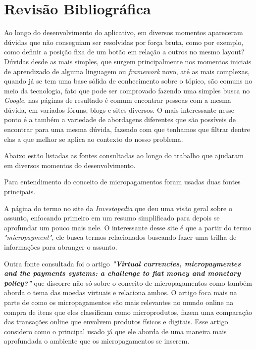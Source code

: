 \documentclass[hidelinks,12pt]{article}
\begin{document}
\section{Revis\~ao Bibliogr\'afica} \label{revisao}
Ao longo do desenvolvimento do aplicativo, em diversos momentos apareceram d\'uvidas que n\~ao conseguiam ser resolvidas por for\c{c}a bruta, como por exemplo, como definir a posi\c{c}\~ao fixa de um bot\~ao em rela\c{c}\~ao a outros no mesmo layout? D\'uvidas desde as mais simples, que surgem principalmente nos momentos iniciais de aprendizado de alguma linguagem ou \textit{framework} novo, at\'e as mais complexas, quando j\'a se tem uma base s\'olida de conhecimento sobre o t\'opico, s\~ao comuns no meio da tecnologia, fato que pode ser comprovado fazendo uma simples busca no \textit{Google}, nas p\'aginas de resultado \'e comum encontrar pessoas com a mesma d\'uvida, em variados f\'oruns, blogs e  sites diversos. O mais interessante nesse ponto \'e a tamb\'em a variedade de abordagens diferentes que s\~ao poss\'iveis de encontrar para uma mesma d\'uvida, fazendo com que tenhamos que filtrar dentre elas a que melhor se aplica ao contexto do nosso problema.

Abaixo est\~ao listadas as fontes consultadas ao longo do trabalho que ajudaram em diversos momentos do desenvolvimento.

Para entendimento do conceito de micropagamentos foram usadas duas fontes principais.

A p\'agina do termo \cite{invest} no site da \textit{Investopedia} que deu uma vis\~ao geral sobre o assunto, enfocando primeiro em um resumo simplificado para depois se aprofundar um pouco mais nele. O interessante desse site \'e que a partir do termo \textit{"micropayment"}, ele busca termos relacionados buscando fazer uma trilha de informa\c{c}\~oes para abranger o assunto.

Outra fonte consultada foi o artigo \textbf{\textit{"Virtual currencies, micropaymentes and the payments systems: a challenge to fiat money and monetary policy?"}} \cite{microp} que discorre n\~ao s\'o sobre o conceito de micropagamentos como tamb\'em aborda o tema das moedas virtuais e relaciona ambos. O artigo foca mais na parte de como os micropagamentos s\~ao mais relevantes no mundo online na compra de itens que eles classificam como microprodutos, fazem uma compara\c{c}\~ao das transa\c{c}\~oes online que envolvem produtos f\'isicos e digitais. Esse artigo considero como o principal usado j\'a que ele aborda de uma maneira mais aprofundada o ambiente que os micropagamentos se inserem.
\end{document}
